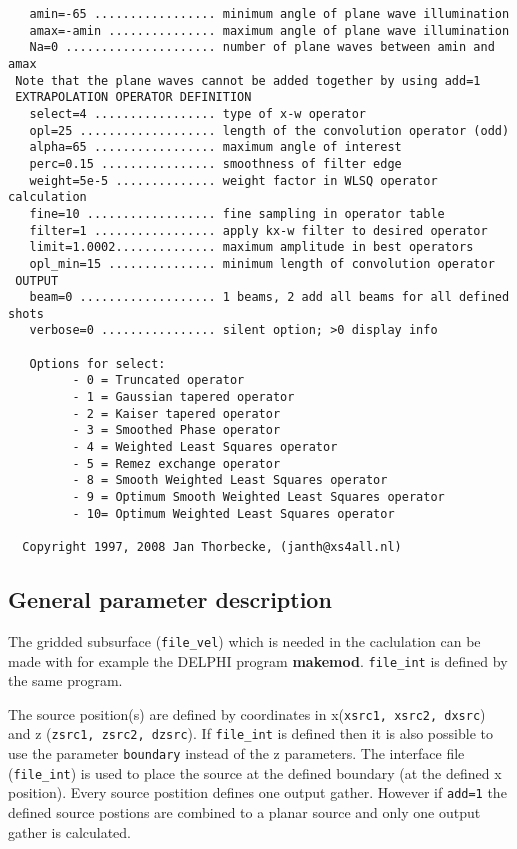 {\begin{verbatim}
   amin=-65 ................. minimum angle of plane wave illumination
   amax=-amin ............... maximum angle of plane wave illumination
   Na=0 ..................... number of plane waves between amin and amax
 Note that the plane waves cannot be added together by using add=1 
 EXTRAPOLATION OPERATOR DEFINITION 
   select=4 ................. type of x-w operator
   opl=25 ................... length of the convolution operator (odd)
   alpha=65 ................. maximum angle of interest
   perc=0.15 ................ smoothness of filter edge
   weight=5e-5 .............. weight factor in WLSQ operator calculation
   fine=10 .................. fine sampling in operator table
   filter=1 ................. apply kx-w filter to desired operator
   limit=1.0002.............. maximum amplitude in best operators
   opl_min=15 ............... minimum length of convolution operator
 OUTPUT 
   beam=0 ................... 1 beams, 2 add all beams for all defined shots
   verbose=0 ................ silent option; >0 display info
  
   Options for select:
         - 0 = Truncated operator
         - 1 = Gaussian tapered operator
         - 2 = Kaiser tapered operator
         - 3 = Smoothed Phase operator
         - 4 = Weighted Least Squares operator
         - 5 = Remez exchange operator
         - 8 = Smooth Weighted Least Squares operator
         - 9 = Optimum Smooth Weighted Least Squares operator
         - 10= Optimum Weighted Least Squares operator
  
  Copyright 1997, 2008 Jan Thorbecke, (janth@xs4all.nl) 
\end{verbatim}}

\subsection{General parameter description}

The gridded subsurface ({\tt file\_vel}) which is needed in the caclulation can be made with for example the DELPHI program {\bf makemod}. {\tt file\_int} is defined by the same program. 

The source position(s) are defined by coordinates in x({\tt xsrc1, xsrc2, dxsrc}) and z ({\tt zsrc1, zsrc2, dzsrc}). If {\tt file\_int} is defined then it is also possible to use the parameter {\tt boundary} instead of the z parameters. The interface file ({\tt file\_int}) is used to place the source at the defined boundary (at the defined x position). Every source postition defines one output gather. However if {\tt add=1} the defined source postions are combined to a planar source and only one output gather is calculated.

